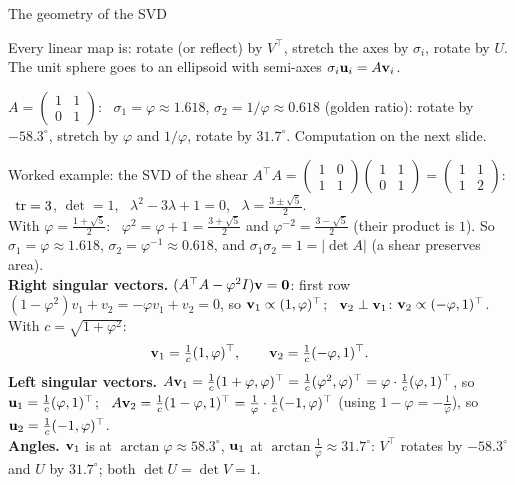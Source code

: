 \documentclass[aspectratio=1610,11pt]{beamer}
\begin{document}
\begin{frame}{The geometry of the SVD}
    \centering{}
    \\[0.6em]
    \raggedright\small
    Every linear map is: rotate (or reflect) by $V^\top$, stretch the axes by $\sigma_i$, rotate by $U$. The unit sphere goes to an ellipsoid with semi-axes $\sigma_i\mathbf{u}_i = A\mathbf{v}_i$.
    \begin{example}
        \small $A = \begin{pmatrix} 1 & 1 \\ 0 & 1\end{pmatrix}$: \ $\sigma_1 = \varphi \approx 1.618$, $\sigma_2 = 1/\varphi \approx 0.618$ (golden ratio): rotate by $-58.3^\circ$, stretch by $\varphi$ and $1/\varphi$, rotate by $31.7^\circ$. Computation on the next slide.
    \end{example}
\end{frame}

\begin{frame}{Worked example: the SVD of the shear}
    \small
    $A^\top A = \begin{pmatrix} 1 & 0 \\ 1 & 1 \end{pmatrix}\begin{pmatrix} 1 & 1 \\ 0 & 1 \end{pmatrix} = \begin{pmatrix} 1 & 1 \\ 1 & 2 \end{pmatrix}$: \ $\operatorname{tr} = 3$, $\det = 1$, \ $\lambda^2 - 3\lambda + 1 = 0$, \ $\lambda = \frac{3 \pm \sqrt5}{2}$.
    \\[0.3em]
    With $\varphi = \frac{1 + \sqrt5}{2}$: \ $\varphi^2 = \varphi + 1 = \frac{3 + \sqrt5}{2}$ and $\varphi^{-2} = \frac{3 - \sqrt5}{2}$ (their product is $1$). So $\sigma_1 = \varphi \approx 1.618$, $\sigma_2 = \varphi^{-1} \approx 0.618$, and $\sigma_1\sigma_2 = 1 = |\det A|$ (a shear preserves area).
    \\[0.3em]
    \textbf{Right singular vectors.} $(A^\top A - \varphi^2I)\mathbf{v} = \mathbf{0}$: first row $(1 - \varphi^2)v_1 + v_2 = -\varphi v_1 + v_2 = 0$, so $\mathbf{v}_1 \propto (1, \varphi)^\top$; \ $\mathbf{v}_2 \perp \mathbf{v}_1$: $\mathbf{v}_2 \propto (-\varphi, 1)^\top$. With $c = \sqrt{1 + \varphi^2}$:
    \[\mathbf{v}_1 = \tfrac{1}{c}(1, \varphi)^\top, \qquad \mathbf{v}_2 = \tfrac{1}{c}(-\varphi, 1)^\top.\]
    \textbf{Left singular vectors.} $A\mathbf{v}_1 = \frac{1}{c}(1 + \varphi, \varphi)^\top = \frac{1}{c}(\varphi^2, \varphi)^\top = \varphi\cdot\frac{1}{c}(\varphi, 1)^\top$, so $\mathbf{u}_1 = \frac{1}{c}(\varphi, 1)^\top$; \ $A\mathbf{v}_2 = \frac{1}{c}(1 - \varphi, 1)^\top = \frac{1}{\varphi}\cdot\frac{1}{c}(-1, \varphi)^\top$ (using $1 - \varphi = -\frac{1}{\varphi}$), so $\mathbf{u}_2 = \frac{1}{c}(-1, \varphi)^\top$.
    \\[0.3em]
    \textbf{Angles.} $\mathbf{v}_1$ is at $\arctan\varphi \approx 58.3^\circ$, $\mathbf{u}_1$ at $\arctan\frac{1}{\varphi} \approx 31.7^\circ$: $V^\top$ rotates by $-58.3^\circ$ and $U$ by $31.7^\circ$; both $\det U = \det V = 1$.
\end{frame}
\end{document}
